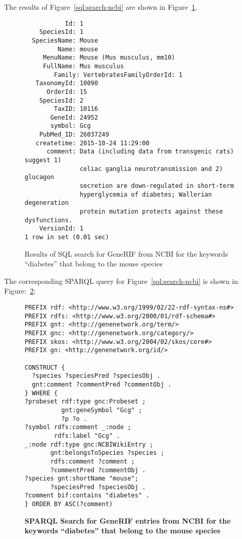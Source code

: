 The results of Figure~\ref{sql:search-ncbi} are shown in Figure~\ref{sql:ncbi-results}.

\begin{figure}[H]
\centering
\begin{verbatim}
           Id: 1
    SpeciesId: 1
  SpeciesName: Mouse
         Name: mouse
     MenuName: Mouse (Mus musculus, mm10)
     FullName: Mus musculus
        Family: VertebratesFamilyOrderId: 1
   TaxonomyId: 10090
      OrderId: 15
    SpeciesId: 2
        TaxID: 10116
       GeneId: 24952
       symbol: Gcg
    PubMed_ID: 26037249
   createtime: 2015-10-24 11:29:00
      comment: Data (including data from transgenic rats) suggest 1)
               celiac ganglia neurotransmission and 2) glucagon
               secretion are down-regulated in short-term
               hyperglycemia of diabetes; Wallerian degeneration
               protein mutation protects against these dysfunctions.
    VersionId: 1
1 row in set (0.01 sec)
\end{verbatim}
\caption[SQL Results: Search for GeneRIF entries from NCBI for the keyword ``diabetes'' that belongs to the mouse species]{Results of SQL search for GeneRIF from NCBI for the keywords ``diabetes'' that belong to the mouse species}\label{sql:ncbi-results}
\end{figure}

The corresponding SPARQL query for Figure~\ref{sql:search-ncbi} is shown in Figure:~\ref{sparql:ncbi-rif}:

\begin{figure}[H]
\centering
\begin{verbatim}
PREFIX rdf: <http://www.w3.org/1999/02/22-rdf-syntax-ns#>
PREFIX rdfs: <http://www.w3.org/2000/01/rdf-schema#>
PREFIX gnt: <http://genenetwork.org/term/>
PREFIX gnc: <http://genenetwork.org/category/>
PREFIX skos: <http://www.w3.org/2004/02/skos/core#>
PREFIX gn: <http://genenetwork.org/id/>

CONSTRUCT {
  ?species ?speciesPred ?speciesObj .
  gnt:comment ?commentPred ?commentObj .
} WHERE {
?probeset rdf:type gnc:Probeset ;
          gnt:geneSymbol "Gcg" ;
          ?p ?o .
?symbol rdfs:comment _:node ;
        rdfs:label "Gcg" .
_:node rdf:type gnc:NCBIWikiEntry ;
       gnt:belongsToSpecies ?species ;
       rdfs:comment ?comment ;
       ?commentPred ?commentObj .
?species gnt:shortName "mouse";
       ?speciesPred ?speciesObj .
?comment bif:contains "diabetes" .
} ORDER BY ASC(?comment)
\end{verbatim}
\caption[SPARQL: Search for GeneRIF entries from NCBI for the keyword ``diabetes'' that belongs to the mouse species]{\textbf{SPARQL Search for GeneRIF entries from NCBI for the keywords ``diabetes'' that belong to the mouse species}}\label{sparql:ncbi-rif}
\end{figure}

